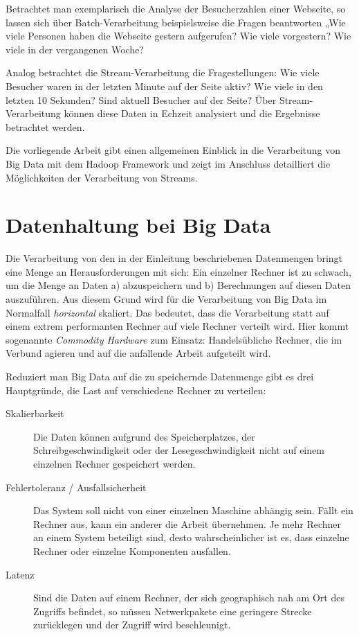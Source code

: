 \documentclass[a4paper,11pt]{scrartcl}
\begin{document}
Betrachtet man exemplarisch die Analyse der Besucherzahlen einer Webseite, so
lassen sich über Batch-Verarbeitung beispielsweise die Fragen beantworten „Wie
viele Personen haben die Webseite gestern aufgerufen? Wie viele vorgestern?
Wie viele in der vergangenen Woche?

Analog betrachtet die Stream-Verarbeitung die Fragestellungen: Wie viele
Besucher waren in der letzten Minute auf der Seite aktiv? Wie viele in den
letzten 10 Sekunden? Sind aktuell Besucher auf der Seite? Über
Stream-Verarbeitung können diese Daten in Echzeit analysiert und die Ergebnisse
betrachtet werden.

Die vorliegende Arbeit gibt einen allgemeinen Einblick in die Verarbeitung von
Big Data mit dem Hadoop Framework und zeigt im Anschluss detailliert die
Möglichkeiten der Verarbeitung von Streams.


\section{Datenhaltung bei Big Data}
Die Verarbeitung von den in der Einleitung beschriebenen Datenmengen bringt
eine Menge an Herausforderungen mit sich: Ein einzelner Rechner ist zu schwach,
um die Menge an Daten a) abzuspeichern und b) Berechnungen auf diesen Daten
auszuführen. Aus diesem Grund wird für die Verarbeitung von Big Data im
Normalfall \textit{horizontal} skaliert. Das bedeutet, dass die Verarbeitung
statt auf einem extrem performanten Rechner auf viele Rechner verteilt wird.
Hier kommt sogenannte \textit{Commodity Hardware} zum Einsatz: Handelsübliche
Rechner, die im Verbund agieren und auf die anfallende Arbeit aufgeteilt wird.

Reduziert man Big Data auf die zu speichernde Datenmenge gibt es drei
Hauptgründe, die Last auf verschiedene Rechner zu verteilen:

\begin{description}
  \item[Skalierbarkeit] Die Daten können aufgrund des Speicherplatzes, der
    Schreibgeschwindigkeit oder der Lesegeschwindigkeit nicht auf einem
    einzelnen Rechner gespeichert werden.
  \item[Fehlertoleranz / Ausfallsicherheit] Das System soll nicht von einer
    einzelnen Maschine abhängig sein. Fällt ein Rechner aus, kann ein anderer
    die Arbeit übernehmen. Je mehr Rechner an einem System beteiligt sind,
    desto wahrscheinlicher ist es, dass einzelne Rechner oder einzelne
    Komponenten ausfallen.
  \item[Latenz] Sind die Daten auf einem Rechner, der sich geographisch nah am
    Ort des Zugriffs befindet, so müssen Netwerkpakete eine geringere Strecke
    zurücklegen und der Zugriff wird beschleunigt.
\end{description}
\end{document}
